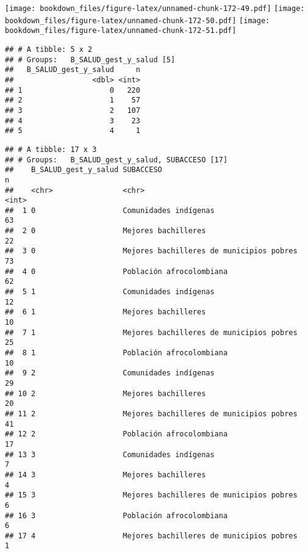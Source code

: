 \documentclass[]{article}
\theoremstyle{definition}
\theoremstyle{definition}
\theoremstyle{definition}
\theoremstyle{remark}
\begin{document}
\texttt{[image: bookdown\_files/figure-latex/unnamed-chunk-172-49.pdf]}
\texttt{[image: bookdown\_files/figure-latex/unnamed-chunk-172-50.pdf]}
\texttt{[image: bookdown\_files/figure-latex/unnamed-chunk-172-51.pdf]}

\begin{verbatim}
## # A tibble: 5 x 2
## # Groups:   B_SALUD_gest_y_salud [5]
##   B_SALUD_gest_y_salud     n
##                  <dbl> <int>
## 1                    0   220
## 2                    1    57
## 3                    2   107
## 4                    3    23
## 5                    4     1
\end{verbatim}

\begin{verbatim}
## # A tibble: 17 x 3
## # Groups:   B_SALUD_gest_y_salud, SUBACCESO [17]
##    B_SALUD_gest_y_salud SUBACCESO                                    n
##    <chr>                <chr>                                    <int>
##  1 0                    Comunidades indígenas                       63
##  2 0                    Mejores bachilleres                         22
##  3 0                    Mejores bachilleres de municipios pobres    73
##  4 0                    Población afrocolombiana                    62
##  5 1                    Comunidades indígenas                       12
##  6 1                    Mejores bachilleres                         10
##  7 1                    Mejores bachilleres de municipios pobres    25
##  8 1                    Población afrocolombiana                    10
##  9 2                    Comunidades indígenas                       29
## 10 2                    Mejores bachilleres                         20
## 11 2                    Mejores bachilleres de municipios pobres    41
## 12 2                    Población afrocolombiana                    17
## 13 3                    Comunidades indígenas                        7
## 14 3                    Mejores bachilleres                          4
## 15 3                    Mejores bachilleres de municipios pobres     6
## 16 3                    Población afrocolombiana                     6
## 17 4                    Mejores bachilleres de municipios pobres     1
\end{verbatim}
\end{document}
